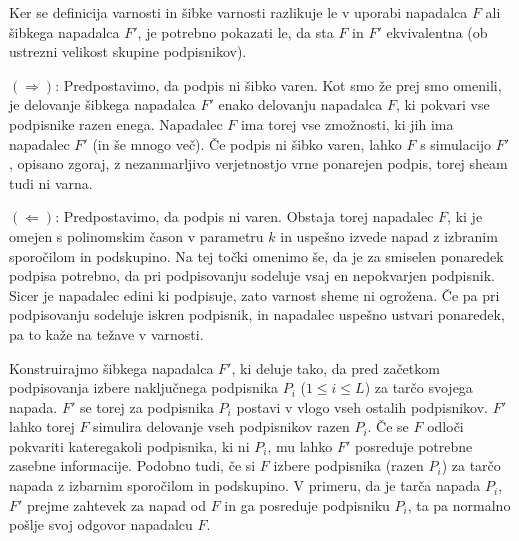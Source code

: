 \documentclass[isrm2, tisk]{fmfdelo}
\begin{document}
\begin{dokaz}
    Ker se definicija varnosti in šibke varnosti razlikuje le v uporabi napadalca $F$ ali šibkega
    napadalca $F'$, je potrebno pokazati le, da sta $F$ in $F'$ ekvivalentna (ob ustrezni velikost
    skupine podpisnikov).

    $(\Rightarrow)$: Predpostavimo, da podpis ni šibko varen. Kot smo že prej smo omenili, je delovanje
    šibkega napadalca $F'$ enako delovanju napadalca $F$, ki pokvari vse podpisnike razen enega.
    Napadalec $F$ ima torej vse zmožnosti, ki jih ima napadalec $F'$ (in še mnogo več). Če podpis ni
    šibko varen, lahko $F$ s simulacijo $F'$, opisano zgoraj, z nezanmarljivo verjetnostjo vrne
    ponarejen podpis, torej sheam tudi ni varna.

    $(\Leftarrow)$: Predpostavimo, da podpis ni varen. Obstaja torej napadalec $F$, ki je omejen
    s polinomskim čason v parametru $k$ in uspešno izvede napad z izbranim sporočilom in podskupino.
    Na tej točki omenimo še, da je za smiselen ponaredek podpisa potrebno, da pri podpisovanju sodeluje
    vsaj en nepokvarjen podpisnik. Sicer je napadalec edini ki podpisuje, zato varnost sheme ni ogrožena.
    Če pa pri podpisovanju sodeluje iskren podpisnik, in napadalec uspešno ustvari ponaredek, pa
    to kaže na težave v varnosti.

    Konstruirajmo šibkega napadalca $F'$, ki deluje tako, da pred začetkom podpisovanja izbere naključnega
    podpisnika $P_i$ ($1 \le i \le L$) za tarčo svojega napada. $F'$ se torej za podpisnika $P_i$ postavi
    v vlogo vseh ostalih podpisnikov. $F'$ lahko torej $F$ simulira delovanje vseh podpisnikov razen
    $P_i$. Če se $F$ odloči pokvariti kateregakoli podpisnika, ki ni $P_i$, mu lahko $F'$ posreduje
    potrebne zasebne informacije. Podobno tudi, če si $F$ izbere podpisnika (razen $P_i$) za tarčo napada z
    izbarnim sporočilom in podskupino. V primeru, da je tarča napada $P_i$, $F'$ prejme zahtevek za
    napad od $F$ in ga posreduje podpisniku $P_i$, ta pa normalno pošlje svoj odgovor napadalcu $F$.


\end{dokaz}
\end{document}
